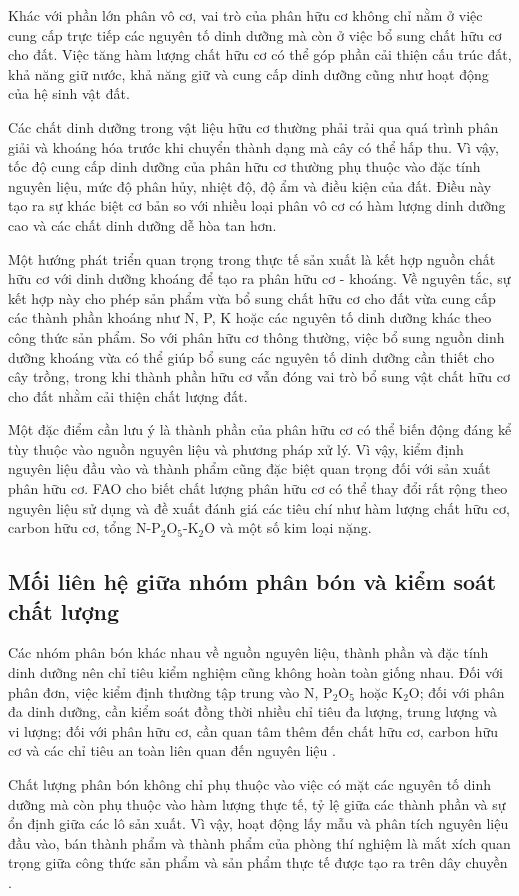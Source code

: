 Khác với phần lớn phân vô cơ, vai trò của phân hữu cơ không chỉ nằm ở việc cung cấp trực tiếp các nguyên tố dinh dưỡng mà còn ở việc bổ sung chất hữu cơ cho đất. 
Việc tăng hàm lượng chất hữu cơ có thể góp phần cải thiện cấu trúc đất, khả năng giữ nước, khả năng giữ và cung cấp dinh dưỡng cũng như hoạt động của hệ sinh vật đất.

Các chất dinh dưỡng trong vật liệu hữu cơ thường phải trải qua quá trình phân giải và khoáng hóa trước khi chuyển thành dạng mà cây có thể hấp thu. 
Vì vậy, tốc độ cung cấp dinh dưỡng của phân hữu cơ thường phụ thuộc vào đặc tính nguyên liệu, mức độ phân hủy, nhiệt độ, độ ẩm và điều kiện của đất. 
Điều này tạo ra sự khác biệt cơ bản so với nhiều loại phân vô cơ có hàm lượng dinh dưỡng cao và các chất dinh dưỡng dễ hòa tan hơn.

Một hướng phát triển quan trọng trong thực tế sản xuất là kết hợp nguồn chất hữu cơ với dinh dưỡng khoáng để tạo ra phân hữu cơ - khoáng.
Về nguyên tắc, sự kết hợp này cho phép sản phẩm vừa bổ sung chất hữu cơ cho đất vừa cung cấp các thành phần khoáng như N, P, K hoặc các nguyên tố dinh dưỡng khác theo công thức sản phẩm. 
So với phân hữu cơ thông thường, việc bổ sung nguồn dinh dưỡng khoáng vừa có thể giúp bổ sung các nguyên tố dinh dưỡng cần thiết cho cây trồng, trong khi thành phần hữu cơ vẫn đóng vai trò bổ sung vật chất hữu cơ cho đất nhằm cải thiện chất lượng đất.\cite{fao-organic-fertilizers,qcvn106-fertilizer-quality}

Một đặc điểm cần lưu ý là thành phần của phân hữu cơ có thể biến động đáng kể tùy thuộc vào nguồn nguyên liệu và phương pháp xử lý. 
Vì vậy, kiểm định nguyên liệu đầu vào và thành phẩm cũng đặc biệt quan trọng đối với sản xuất phân hữu cơ. 
FAO cho biết chất lượng phân hữu cơ có thể thay đổi rất rộng theo nguyên liệu sử dụng và đề xuất đánh giá các tiêu chí như hàm lượng chất hữu cơ, carbon hữu cơ, tổng N-\(\mathrm{P_2O_5}\)-\(\mathrm{K_2O}\) và một số kim loại nặng.\cite{fao-organic-fertilizers,qcvn106-fertilizer-quality}

\subsection{Mối liên hệ giữa nhóm phân bón và kiểm soát chất lượng}
Các nhóm phân bón khác nhau về nguồn nguyên liệu, thành phần và đặc tính dinh dưỡng nên chỉ tiêu kiểm nghiệm cũng không hoàn toàn giống nhau. Đối với phân đơn, việc kiểm định thường tập trung vào N, \(\mathrm{P_2O_5}\) hoặc \(\mathrm{K_2O}\); đối với phân đa dinh dưỡng, cần kiểm soát đồng thời nhiều chỉ tiêu đa lượng, trung lượng và vi lượng; đối với phân hữu cơ, cần quan tâm thêm đến chất hữu cơ, carbon hữu cơ và các chỉ tiêu an toàn liên quan đến nguyên liệu \cite{fao-fertilizer-specifications,qcvn106-fertilizer-quality}.

Chất lượng phân bón không chỉ phụ thuộc vào việc có mặt các nguyên tố dinh dưỡng mà còn phụ thuộc vào hàm lượng thực tế, tỷ lệ giữa các thành phần và sự ổn định giữa các lô sản xuất. Vì vậy, hoạt động lấy mẫu và phân tích nguyên liệu đầu vào, bán thành phẩm và thành phẩm của phòng thí nghiệm là mắt xích quan trọng giữa công thức sản phẩm và sản phẩm thực tế được tạo ra trên dây chuyền \cite{company-internal-documents,tcvn9486-sampling}.
